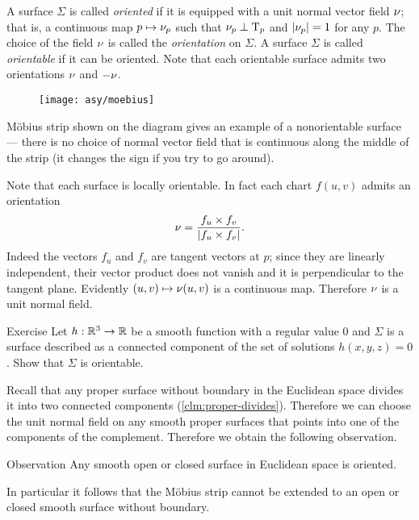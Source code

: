 A surface $\Sigma$ is called \emph{oriented} if it is equipped with a unit normal vector field $\nu$;
that is, a continuous map $p\mapsto \nu_p$ such that $\nu_p\perp\mathrm{T}_p$ and $|\nu_p|=1$ for any $p$.
The choice of the field $\nu$ is called the \emph{orientation} on $\Sigma$.
A surface $\Sigma$ is called \emph{orientable} if it can be oriented.
Note that each orientable surface admits two orientations $\nu$ and $-\nu$. %

\begin{wrapfigure}[8]{o}{40 mm}
\vskip-0mm
\centering
\texttt{[image: asy/moebius]}
\vskip0mm
\end{wrapfigure}

M\"obius strip shown on the diagram gives an example of a nonorientable surface --- there is no choice of normal vector field that is continuous along the middle of the strip (it changes the sign if you try to go around).


Note that each surface is locally orientable.
In fact each chart $f(u,v)$ admits an orientation 
\[\nu=
\frac{f_u\times f_v}
{\left|f_u\times f_v\right|}.\]
Indeed the vectors $f_u$ and $f_v$ are tangent vectors at $p$; 
since they are linearly independent, their vector product does not vanish and it is perpendicular to the tangent plane.
Evidently $(u,v)\mapsto \nu(u,v)$ is a continuous map.
Therefore $\nu$ is a unit normal field. 

\begin{thm}{Exercise}\label{ex:implicit-orientable}
Let $h:\mathbb{R}^3\to\mathbb{R}$ be a smooth function with a regular value $0$ and $\Sigma$ is a surface described as a connected component of the set of solutions $h(x,y,z)=0$.
Show that $\Sigma$ is orientable.
\end{thm}

Recall that any proper surface without boundary in the Euclidean space divides it into two connected components (\ref{clm:proper-divides}).
Therefore we can choose the unit normal field on any smooth proper surfaces that points into one of the components of the complement.
Therefore we obtain the following observation. 

\begin{thm}{Observation}
Any smooth open or closed surface in Euclidean space is oriented.
\end{thm}

In particular it follows that the M\"obius strip cannot be extended to an open or closed smooth surface without boundary.

